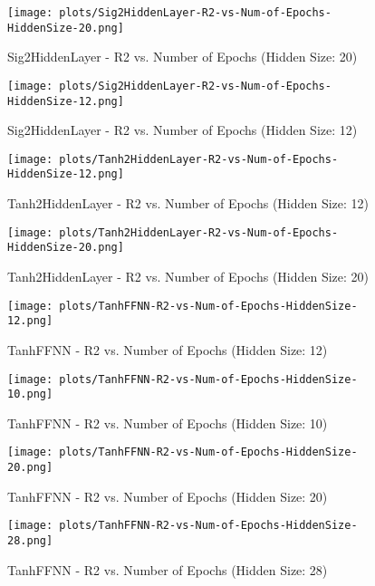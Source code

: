 
\begin{figure}[H]
    \centering
    \texttt{[image: plots/Sig2HiddenLayer-R2-vs-Num-of-Epochs-HiddenSize-20.png]}
    \caption{Sig2HiddenLayer - R2 vs. Number of Epochs (Hidden Size: 20)}
\end{figure}

\begin{figure}[H]
    \centering
    \texttt{[image: plots/Sig2HiddenLayer-R2-vs-Num-of-Epochs-HiddenSize-12.png]}
    \caption{Sig2HiddenLayer - R2 vs. Number of Epochs (Hidden Size: 12)}
\end{figure}

\begin{figure}[H]
    \centering
    \texttt{[image: plots/Tanh2HiddenLayer-R2-vs-Num-of-Epochs-HiddenSize-12.png]}
    \caption{Tanh2HiddenLayer - R2 vs. Number of Epochs (Hidden Size: 12)}
\end{figure}

\begin{figure}[H]
    \centering
    \texttt{[image: plots/Tanh2HiddenLayer-R2-vs-Num-of-Epochs-HiddenSize-20.png]}
    \caption{Tanh2HiddenLayer - R2 vs. Number of Epochs (Hidden Size: 20)}
\end{figure}

\begin{figure}[H]
    \centering
    \texttt{[image: plots/TanhFFNN-R2-vs-Num-of-Epochs-HiddenSize-12.png]}
    \caption{TanhFFNN - R2 vs. Number of Epochs (Hidden Size: 12)}
\end{figure}

\begin{figure}[H]
    \centering
    \texttt{[image: plots/TanhFFNN-R2-vs-Num-of-Epochs-HiddenSize-10.png]}
    \caption{TanhFFNN - R2 vs. Number of Epochs (Hidden Size: 10)}
\end{figure}

\begin{figure}[H]
    \centering
    \texttt{[image: plots/TanhFFNN-R2-vs-Num-of-Epochs-HiddenSize-20.png]}
    \caption{TanhFFNN - R2 vs. Number of Epochs (Hidden Size: 20)}
\end{figure}

\begin{figure}[H]
    \centering
    \texttt{[image: plots/TanhFFNN-R2-vs-Num-of-Epochs-HiddenSize-28.png]}
    \caption{TanhFFNN - R2 vs. Number of Epochs (Hidden Size: 28)}
\end{figure}

